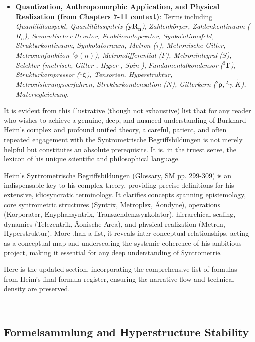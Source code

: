 \documentclass[12pt]{article}
\begin{document}
\begin{itemize}
\begin{itemize}
        \item \textbf{Quantization, Anthropomorphic Application, and Physical Realization (from Chapters 7-11 context)}: Terms including \textit{Quantitätsaspekt, Quantitätssyntrix (\( \mathbf{yR_n} \)), Zahlenkörper, Zahlenkontinuum (\(R_n\)), Semantischer Iterator, Funktionaloperator, Synkolationsfeld, Strukturkontinuum, Synkolatorraum, Metron (\(\tau\)), Metronische Gitter, Metronenfunktion (\(\phi(n)\)), Metrondifferential (\( F \)), Metronintegral (\( S \)), Selektor (metrisch, Gitter-, Hyper-, Spin-), Fundamentalkondensor (\( {}^3\bm{\Gamma} \)), Strukturkompressor (\( {}^4\bm{\zeta} \)), Tensorien, Hyperstruktur, Metronisierungsverfahren, Strukturkondensation (\(N\)), Gitterkern (\( {}^2\bm{\rho}, {}^2\gamma, \tilde{K} \)), Materiegleichung.}
    \end{itemize}
    It is evident from this illustrative (though not exhaustive) list that for any reader who wishes to achieve a genuine, deep, and nuanced understanding of Burkhard Heim's complex and profound unified theory, a careful, patient, and often repeated engagement with the Syntrometrische Begriffsbildungen is not merely helpful but constitutes an absolute prerequisite. It is, in the truest sense, the lexicon of his unique scientific and philosophical language.
\end{itemize}

Heim's Syntrometrische Begriffsbildungen (Glossary, SM pp. 299-309) is an indispensable key to his complex theory, providing precise definitions for his extensive, idiosyncratic terminology. It clarifies concepts spanning epistemology, core syntrometric structures (Syntrix, Metroplex, Äondyne), operations (Korporator, Enyphansyntrix, Transzendenzsynkolator), hierarchical scaling, dynamics (Telezentrik, Äonische Area), and physical realization (Metron, Hyperstruktur). More than a list, it reveals inter-conceptual relationships, acting as a conceptual map and underscoring the systemic coherence of his ambitious project, making it essential for any deep understanding of Syntrometrie.

Here is the updated section, incorporating the comprehensive list of formulas from Heim’s final formula register, ensuring the narrative flow and technical density are preserved.

---

\subsection{Formelsammlung and Hyperstructure Stability}
\label{sec:formelsammlung}
\end{document}
